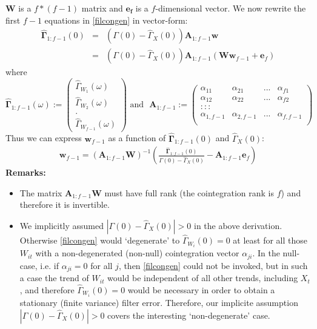 \documentclass[11pt]{article}
\begin{document}
$\mathbf{W}$ is a $f*(f-1)$ matrix and $\mathbf{e_f}$ is a $f$-dimensional vector. We now rewrite the first $f-1$ equations in  \ref{filcongen} in vector-form:
\begin{eqnarray}
\mathbf{\hat{\Gamma}}_{1:f-1}(0)&=&(\Gamma(0)-\hat{\Gamma}_X(0))\mathbf{A}_{1:f-1}\mathbf{w}\nonumber\\
&=&(\Gamma(0)-\hat{\Gamma}_X(0))\mathbf{A}_{1:f-1}\left(\mathbf{Ww}_{f-1}+\mathbf{e}_f\right)
\end{eqnarray}
where 
\[\mathbf{\hat{\Gamma}}_{1:f-1}(\omega):=\left(\begin{array}{c}\hat{\Gamma}_{W_1}(\omega)\\ \hat{\Gamma}_{W_2}(\omega)\\.\\ \hat{\Gamma}_{W_{f-1}}(\omega)\end{array}\right)\textrm{~and~~}\mathbf{A}_{1:f-1}:=
\left(\begin{array}{cccc}\alpha_{11}&\alpha_{21}&...&\alpha_{f1}\\
\alpha_{12}&\alpha_{22}&...&\alpha_{f2}\\
:::\\
\alpha_{1,f-1}&\alpha_{2,f-1}&...&\alpha_{f,f-1}\\
\end{array}\right)\]
Thus we can express $\mathbf{w}_{f-1}$ as a function of $\mathbf{\hat{\Gamma}}_{1:f-1}(0)$ and $\hat{\Gamma}_X(0)$:
\begin{eqnarray}\label{wfinv}
\mathbf{w}_{f-1}=\left(\mathbf{A}_{1:f-1}\mathbf{W}\right)^{-1}\left(\frac{\mathbf{\hat{\Gamma}}_{1:f-1}(0)}{\Gamma(0)-\hat{\Gamma}_X(0)}-\mathbf{A}_{1:f-1}\mathbf{e}_f\right)
\end{eqnarray} 
\textbf{Remarks:}
\begin{itemize}
\item The matrix $\mathbf{A}_{1:f-1}\mathbf{W}$ must have full rank (the cointegration rank is $f$) and therefore it is invertible. 
\item We implicitly assumed $|\Gamma(0)-\hat{\Gamma}_X(0)|>0$ in the above derivation. Otherwise \ref{filcongen} would `degenerate' to $\hat{\Gamma}_{W_i}(0)=0$ at least for all those $W_{it}$ with a non-degenerated (non-null) cointegration vector $\alpha_{ji}$. In the null-case, i.e. if $\alpha_{ji}=0$ for all $j$, then  \ref{filcongen} could not be invoked, but in such a case the trend of $W_{it}$ would be independent of all other trends, including $X_t$, and therefore  $\hat{\Gamma}_{W_i}(0)=0$ would be necessary in order to obtain a stationary (finite variance) filter error. Therefore, our implicite assumption  $|\Gamma(0)-\hat{\Gamma}_X(0)|>0$ covers the interesting `non-degenerate' case.
\end{itemize}
\end{document}
